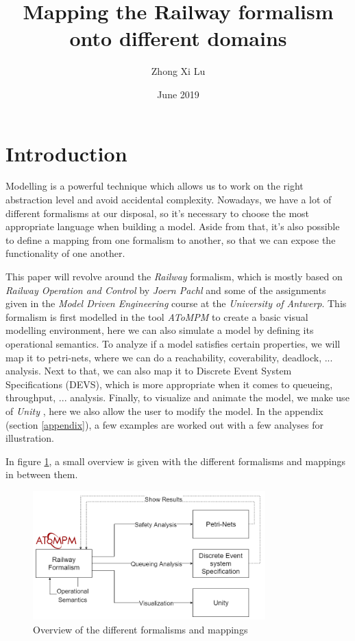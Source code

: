 \documentclass{article}
\title{Mapping the Railway formalism onto different domains}
\author{Zhong Xi Lu}
\affil{\small Department of Mathematics \\ and Computer Science \\ University of Antwerp, Belgium \\ \email{zhong-xi.lu@student.uantwerpen.be}}
\date{June 2019}
\begin{document}
\maketitle

\section{Introduction}

Modelling is a powerful technique which allows us to work on the right abstraction level and avoid accidental complexity. Nowadays, we have a lot of different formalisms at our disposal, so it's necessary to choose the most appropriate language when building a model. Aside from that, it's also possible to define a mapping from one formalism to another, so that we can expose the functionality of one another.

This paper will revolve around the \textit{Railway} formalism, which is mostly based on \textit{Railway Operation and Control} \cite{railway_book} by \textit{Joern Pachl} and some of the assignments \cite{assignments} given in the \textit{Model Driven Engineering} course at the \textit{University of Antwerp}. This formalism is first modelled in the tool \textit{AToMPM} \cite{atompm} to create a basic visual modelling environment, here we can also simulate a model by defining its operational semantics. To analyze if a model satisfies certain properties, we will map it to petri-nets, where we can do a reachability, coverability, deadlock, ... analysis. Next to that, we can also map it to Discrete Event System Specifications (DEVS), which is more appropriate when it comes to queueing, throughput, ... analysis. Finally, to visualize and animate the model, we make use of \textit{Unity} \cite{unity}, here we also allow the user to modify the model. In the appendix (section \ref{appendix}), a few examples are worked out with a few analyses for illustration.

In figure \ref{overview}, a small overview is given with the different formalisms and mappings in between them.

\begin{figure}[H]
    \centering
    \includegraphics[width=0.8\textwidth]{images/overview.png}
    \caption{Overview of the different formalisms and mappings}
    \label{overview}
\end{figure}
\end{document}
